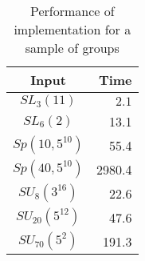 \documentclass[12pt]{article}
\begin{document}
\begin{table}[h]
\caption{Performance of implementation for a sample of groups}
\label{table1}
\begin{center}
\begin{tabular}
{|c|r|} \hline
Input  &   Time  \rule{0cm}{2.5ex}\\
\hline
$SL_3(11)$ & $2.1$      \rule{0cm}{2.5ex}\\ \hline
$SL_6(2)$  & 13.1 \rule{0cm}{2.5ex}\\ \hline
$Sp(10,5^{10})$ & 55.4 \rule{0cm}{2.5ex}\\ \hline
$Sp(40,5^{10})$ & 2980.4 \rule{0cm}{2.5ex}\\ \hline
$SU_{8}(3^{16})$ & 22.6 \rule{0cm}{2.5ex}\\ \hline
$SU_{20}(5^{12})$ & 47.6 \rule{0cm}{2.5ex}\\ \hline
$SU_{70}(5^2)$ & 191.3 \rule{0cm}{2.5ex}\\ \hline
\end{tabular}
\end{center}
\end{table}
\end{document}
